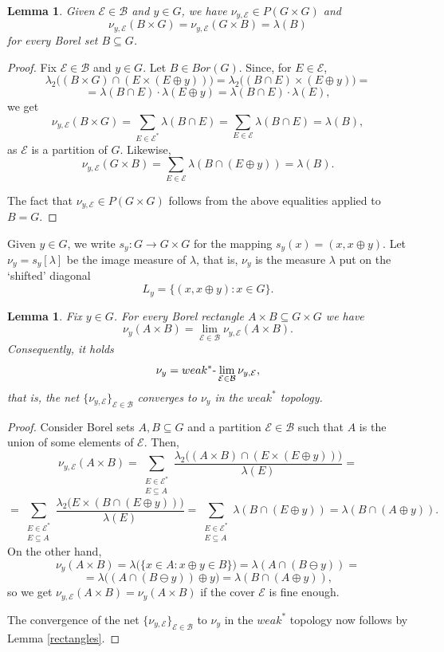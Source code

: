 \documentclass[12pt,fleqn]{amsart}
\numberwithin{equation}{section}
\newtheorem{lemma}[thm]{Lemma}
\theoremstyle{definition}
\def\E{\mathcal E}
\def\E{E^\ast}
\newcommand{\cE}{\mathcal E}
\newcommand{\sub}{\subseteq}
\begin{document}
\begin{lemma}\label{proof:1}
Given $\cE\in\mathcal{B}$ and $y\in G$, we have $\nu_{y,\cE}\in P(G\times G)$ and
\[\nu_{y,\cE}(B\times G)=\nu_{y,\cE}(G\times B)=\lambda(B)\]
for every Borel set $B\sub G$.
\end{lemma}

\begin{proof}
Fix $\cE\in\mathcal{B}$ and $y\in G$. Let $B\in Bor(G)$. Since, for $E \in \cE$,
\[\lambda_2\big( (B\times G)\cap (E\times (E\oplus y))\big)= 
\lambda_2\big((B\cap E)\times (E\oplus y)\big)=\]
\[= \lambda(B\cap E)\cdot \lambda (E\oplus y)=
\lambda(B\cap E)\cdot \lambda (E),\]
we get 
\[ \nu_{y,\cE}(B\times G)=\sum_{E\in\cE^{\ast}} \lambda(B\cap E)=\sum_{E\in\cE} \lambda(B\cap E)=\lambda(B),\] 
as $\cE$ is a partition of $G$.
Likewise,
\[ \nu_{y,\cE}(G\times B)=\sum_{E\in\cE} \lambda(B\cap (E\oplus y))=\lambda(B).\]

The fact that $\nu_{y,\cE}\in P(G\times G)$ follows from the above equalities applied to $B=G$.
\end{proof}

Given $y\in G$, we write $s_y\colon G\to G\times G$ for
the mapping $s_y(x)=(x,x\oplus y)$. Let $\nu_y=s_y[\lambda]$
be the image measure of $\lambda$, that is, $\nu_y$  is the measure  $\lambda$ put
on the `shifted' diagonal 
\[ L_y=\big\{(x,x\oplus y)\colon  x\in G\big\}.\]

\begin{lemma}\label{proof:2}
Fix $y\in G$. For every Borel rectangle $A\times B\sub G\times G$ we have
\[ \nu_y(A\times B)=\lim_{\cE\in\mathcal{B}}\nu_{y,\cE}(A\times B).\]
Consequently, it holds
\[\nu_y=weak^\ast{\mathchar"2D}\lim_{\cE \in \mathcal{B}}\nu_{y,\cE},\] 
that is, the
net $\{\nu_{y,\cE}\}_{\cE\in\mathcal{B}}$ converges to $\nu_y$ in the $weak^\ast$ topology.
\end{lemma}

\begin{proof}
Consider Borel sets $A,B\sub G$ and a
partition $\cE \in \mathcal{B}$ such that $A$ is the union of
some elements of $\cE$. Then,
\[ \nu_{y,\cE}(A\times B)=\sum_{\substack{E\in\cE^{\ast}\\E\subseteq A}} 
\frac{\lambda_2\big((A\times B)\cap (E\times (E\oplus y))\big)}{\lambda(E)}=\]
\[ =\sum_{\substack{E\in\cE^{\ast}\\E\subseteq A}} 
\frac{\lambda_2\big (E\times (B \cap  (E\oplus y))\big)}{\lambda(E)}
= \sum_{\substack{E\in\cE^{\ast}\\E\subseteq A}}\lambda(B\cap (E\oplus y))=
\lambda(B\cap(A\oplus y)).
\]
On the other hand,
\[\tag{$*$}\nu_y(A\times B)=\lambda\big(\{x\in A\colon  x\oplus y\in B\}\big)=\lambda(A\cap (B\ominus y))=\]
\[=\lambda\big((A\cap(B\ominus y))\oplus y\big)=\lambda(B\cap(A\oplus y)),\]
so we get $\nu_{y,\cE}(A\times B)=\nu_y(A\times B)$ if
the cover $\cE$ is fine enough.

The convergence of the net $\{\nu_{y,\cE}\}_{\cE \in \mathcal{B}}$ to $\nu_y$ in the $weak^\ast$ topology now follows by Lemma \ref{rectangles}.
\end{proof}
\end{document}
